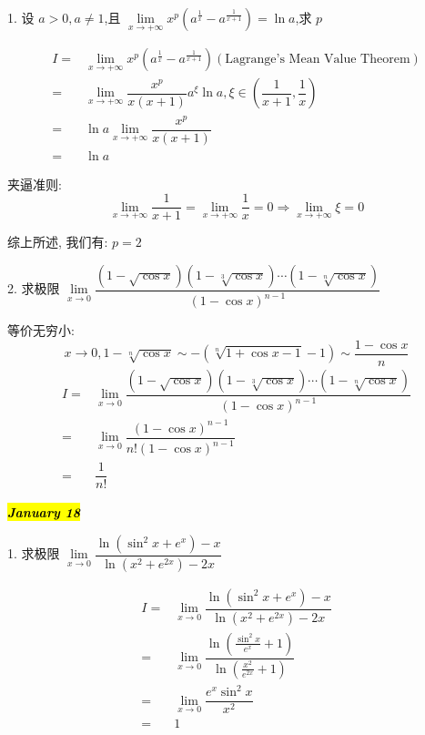1. 设 $a>0,a\neq 1$,且 $\lim\limits_{x\to +\infty}x^{p}(a^{\frac{1}{x}}-a^{\frac{1}{x+1}})=\ln a$,求 $p$
\begin{solution}

	\begin{align*}
		I = & \lim\limits_{x\to +\infty}x^{p}(a^{\frac{1}{x}}-a^{\frac{1}{x+1}})(\text{Lagrange's Mean Value Theorem})\\
		  = & \lim\limits_{x\to +\infty}\dfrac{x^{p}}{x(x+1)}a^{\xi}\ln a, \xi\in(\dfrac{1}{x+1},\dfrac{1}{x})\\
		  = & \ln a\lim\limits_{x\to +\infty}\dfrac{x^{p}}{x(x+1)}\\
		  = & \ln a
	\end{align*}

	夹逼准则: 
	$$\lim\limits_{x\to +\infty} \dfrac{1}{x+1} =\lim\limits_{x\to +\infty} \dfrac{1}{x} = 0\Rightarrow \lim\limits_{x\to +\infty} \xi =0$$

	综上所述, 我们有: $p = 2$
\end{solution}

2. 求极限 $\lim\limits_{x\to 0}\dfrac{(1-\sqrt{\cos x})(1-\sqrt[3]{\cos x})\cdots(1-\sqrt[n]{\cos x})}{(1-\cos x)^{n-1}}$
\begin{solution}
	
	等价无穷小: 
	$$x\to 0, 1- \sqrt[n]{\cos x}\sim -(\sqrt[n]{1+\cos x-1}-1)\sim \dfrac{1-\cos x}{n}$$
	\begin{align*}
		I = & \lim\limits_{x\to 0}\dfrac{(1-\sqrt{\cos x})(1-\sqrt[3]{\cos x})\cdots(1-\sqrt[n]{\cos x})}{(1-\cos x)^{n-1}}\\
		  = & \lim\limits_{x\to 0}\dfrac{(1-\cos x)^{n-1}}{n!(1-\cos x)^{n-1}}\\
		  = & \dfrac{1}{n!}
	\end{align*}
\end{solution}
\hl{\textbf{\textit{January 18}}}

1. 求极限 $\lim\limits_{x\to 0}\dfrac{\ln(\sin^{2}x+e^{x})-x}{\ln(x^{2}+e^{2x})-2x}$
\begin{solution}

	\begin{align*}
		I = & \lim\limits_{x\to 0}\dfrac{\ln(\sin^{2}x+e^{x})-x}{\ln(x^{2}+e^{2x})-2x}\\
		  = & \lim\limits_{x\to 0}\dfrac{\ln(\frac{\sin^{2}x}{e^{x}}+1)}{\ln(\frac{x^{2}}{e^{2x}}+1)}\\
		  = & \lim\limits_{x\to 0}\dfrac{e^{x}\sin^{2}x}{x^{2}}\\
		  = & 1
	\end{align*}
\end{solution}

